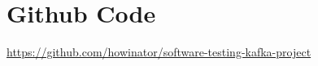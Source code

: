 




\appendix

\section{Github Code}

\href{https://github.com/howinator/software-testing-kafka-project}{https://github.com/howinator/software-testing-kafka-project}

%








